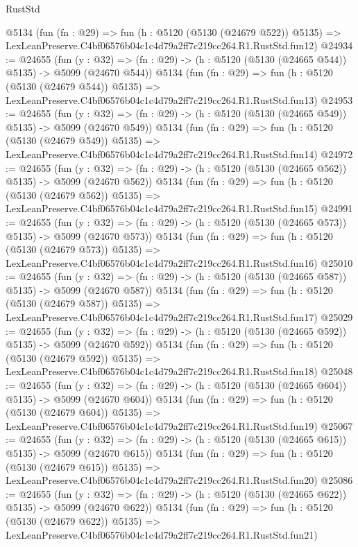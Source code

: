 \begin{lexlean}{RustStd}
\begin{coremodule}
    @5134
    (fun (fn : @29) =>
    fun (h : @5120 (@5130 (@24679 @522)) @5135) =>
    LexLeanPreserve.C4bf06576b04c1c4d79a2ff7c219cc264.R1.RustStd.fun12)
@24934 := @24655
    (fun (y : @32) => (fn : @29) -> (h : @5120 (@5130 (@24665 @544)) @5135) -> @5099 (@24670 @544))
    @5134
    (fun (fn : @29) =>
    fun (h : @5120 (@5130 (@24679 @544)) @5135) =>
    LexLeanPreserve.C4bf06576b04c1c4d79a2ff7c219cc264.R1.RustStd.fun13)
@24953 := @24655
    (fun (y : @32) => (fn : @29) -> (h : @5120 (@5130 (@24665 @549)) @5135) -> @5099 (@24670 @549))
    @5134
    (fun (fn : @29) =>
    fun (h : @5120 (@5130 (@24679 @549)) @5135) =>
    LexLeanPreserve.C4bf06576b04c1c4d79a2ff7c219cc264.R1.RustStd.fun14)
@24972 := @24655
    (fun (y : @32) => (fn : @29) -> (h : @5120 (@5130 (@24665 @562)) @5135) -> @5099 (@24670 @562))
    @5134
    (fun (fn : @29) =>
    fun (h : @5120 (@5130 (@24679 @562)) @5135) =>
    LexLeanPreserve.C4bf06576b04c1c4d79a2ff7c219cc264.R1.RustStd.fun15)
@24991 := @24655
    (fun (y : @32) => (fn : @29) -> (h : @5120 (@5130 (@24665 @573)) @5135) -> @5099 (@24670 @573))
    @5134
    (fun (fn : @29) =>
    fun (h : @5120 (@5130 (@24679 @573)) @5135) =>
    LexLeanPreserve.C4bf06576b04c1c4d79a2ff7c219cc264.R1.RustStd.fun16)
@25010 := @24655
    (fun (y : @32) => (fn : @29) -> (h : @5120 (@5130 (@24665 @587)) @5135) -> @5099 (@24670 @587))
    @5134
    (fun (fn : @29) =>
    fun (h : @5120 (@5130 (@24679 @587)) @5135) =>
    LexLeanPreserve.C4bf06576b04c1c4d79a2ff7c219cc264.R1.RustStd.fun17)
@25029 := @24655
    (fun (y : @32) => (fn : @29) -> (h : @5120 (@5130 (@24665 @592)) @5135) -> @5099 (@24670 @592))
    @5134
    (fun (fn : @29) =>
    fun (h : @5120 (@5130 (@24679 @592)) @5135) =>
    LexLeanPreserve.C4bf06576b04c1c4d79a2ff7c219cc264.R1.RustStd.fun18)
@25048 := @24655
    (fun (y : @32) => (fn : @29) -> (h : @5120 (@5130 (@24665 @604)) @5135) -> @5099 (@24670 @604))
    @5134
    (fun (fn : @29) =>
    fun (h : @5120 (@5130 (@24679 @604)) @5135) =>
    LexLeanPreserve.C4bf06576b04c1c4d79a2ff7c219cc264.R1.RustStd.fun19)
@25067 := @24655
    (fun (y : @32) => (fn : @29) -> (h : @5120 (@5130 (@24665 @615)) @5135) -> @5099 (@24670 @615))
    @5134
    (fun (fn : @29) =>
    fun (h : @5120 (@5130 (@24679 @615)) @5135) =>
    LexLeanPreserve.C4bf06576b04c1c4d79a2ff7c219cc264.R1.RustStd.fun20)
@25086 := @24655
    (fun (y : @32) => (fn : @29) -> (h : @5120 (@5130 (@24665 @622)) @5135) -> @5099 (@24670 @622))
    @5134
    (fun (fn : @29) =>
    fun (h : @5120 (@5130 (@24679 @622)) @5135) =>
    LexLeanPreserve.C4bf06576b04c1c4d79a2ff7c219cc264.R1.RustStd.fun21)

\end{coremodule}
\end{lexlean}
